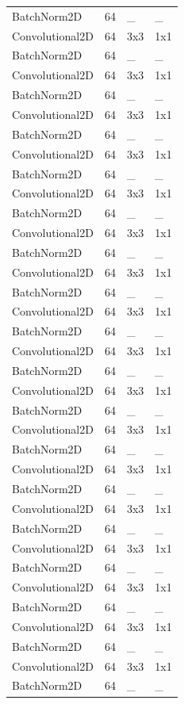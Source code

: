 \begin{center}
\begin{longtable}{|l|l|l|l|}
		BatchNorm2D & 64 & \_ & \_ \\
		Convolutional2D & 64 & 3x3 & 1x1 \\
		BatchNorm2D & 64 & \_ & \_ \\
		Convolutional2D & 64 & 3x3 & 1x1 \\
		BatchNorm2D & 64 & \_ & \_ \\
		Convolutional2D & 64 & 3x3 & 1x1 \\
		BatchNorm2D & 64 & \_ & \_ \\
		Convolutional2D & 64 & 3x3 & 1x1 \\
		BatchNorm2D & 64 & \_ & \_ \\
		Convolutional2D & 64 & 3x3 & 1x1 \\
		BatchNorm2D & 64 & \_ & \_ \\
		Convolutional2D & 64 & 3x3 & 1x1 \\
		BatchNorm2D & 64 & \_ & \_ \\
		Convolutional2D & 64 & 3x3 & 1x1 \\
		BatchNorm2D & 64 & \_ & \_ \\
		Convolutional2D & 64 & 3x3 & 1x1 \\
		BatchNorm2D & 64 & \_ & \_ \\
		Convolutional2D & 64 & 3x3 & 1x1 \\
		BatchNorm2D & 64 & \_ & \_ \\
		Convolutional2D & 64 & 3x3 & 1x1 \\
		BatchNorm2D & 64 & \_ & \_ \\
		Convolutional2D & 64 & 3x3 & 1x1 \\
		BatchNorm2D & 64 & \_ & \_ \\
		Convolutional2D & 64 & 3x3 & 1x1 \\
		BatchNorm2D & 64 & \_ & \_ \\
		Convolutional2D & 64 & 3x3 & 1x1 \\
		BatchNorm2D & 64 & \_ & \_ \\
		Convolutional2D & 64 & 3x3 & 1x1 \\
		BatchNorm2D & 64 & \_ & \_ \\
		Convolutional2D & 64 & 3x3 & 1x1 \\
		BatchNorm2D & 64 & \_ & \_ \\
		Convolutional2D & 64 & 3x3 & 1x1 \\
		BatchNorm2D & 64 & \_ & \_ \\
		Convolutional2D & 64 & 3x3 & 1x1 \\
		BatchNorm2D & 64 & \_ & \_ \\

\end{longtable}
\end{center}
